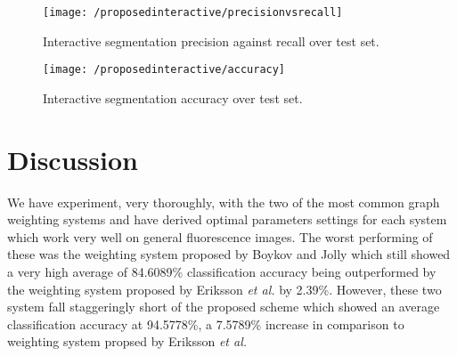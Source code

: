 \begin{figure}[!h]
	\centering
	\texttt{[image: /proposedinteractive/precisionvsrecall]}
	\caption{Interactive segmentation precision against recall over test set.}
	\label{fig:interactiveprecisionvsrecall}
\end{figure}

\begin{figure}[!t]
	\centering
	\texttt{[image: /proposedinteractive/accuracy]}
	\caption{Interactive segmentation accuracy over test set.}
	\label{fig:interactiveaccuracy}
\end{figure}

\newpage
\section{Discussion}
\label{sec:interactivediscussion}


We have experiment, very thoroughly, with the two of the most common graph weighting systems and have derived optimal parameters settings for each system which work very well on general fluorescence images. The worst performing of these was the weighting system proposed by Boykov and Jolly which still showed a very high average of 84.6089\% classification accuracy being outperformed by the weighting system proposed by Eriksson \textit{et al.} by 2.39\%. However, these two system fall staggeringly short of the proposed scheme which showed an average classification accuracy at 94.5778\%, a 7.5789\% increase in comparison to weighting system propsed by Eriksson \textit{et al.}







